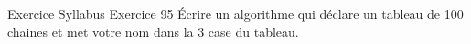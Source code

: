 
\begin{frame}{Exercice \theexercice}{Syllabus Exercice 95}
    Écrire un algorithme qui déclare un tableau de 100 chaines
    et met votre nom dans la 3\ieme{} case du tableau.
\end{frame}
